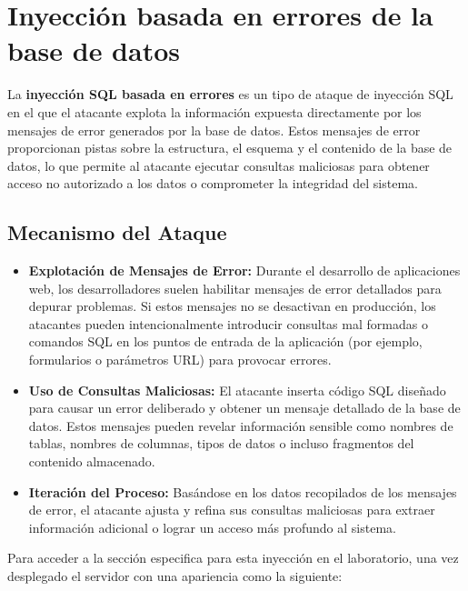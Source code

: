 \documentclass[a4paper,12pt]{article}
\begin{document}
\section{Inyección basada en errores de la base de datos}
La \textbf{inyección SQL basada en errores} es un tipo de ataque de inyección SQL en el que el atacante explota la información 
expuesta directamente por los mensajes de error generados por la base de datos. Estos mensajes de error proporcionan pistas sobre la estructura, 
el esquema y el contenido de la base de datos, lo que permite al atacante ejecutar consultas maliciosas para obtener acceso no autorizado 
a los datos o comprometer la integridad del sistema.

\subsection{Mecanismo del Ataque}

\begin{itemize}
    \item \textbf{Explotación de Mensajes de Error:}
    Durante el desarrollo de aplicaciones web, los desarrolladores suelen habilitar mensajes de error detallados para depurar problemas. 
    Si estos mensajes no se desactivan en producción, los atacantes pueden intencionalmente introducir consultas mal formadas o comandos SQL 
    en los puntos de entrada de la aplicación (por ejemplo, formularios o parámetros URL) para provocar errores.

    \item \textbf{Uso de Consultas Maliciosas:}
    El atacante inserta código SQL diseñado para causar un error deliberado y obtener un mensaje detallado de la base de datos. 
    Estos mensajes pueden revelar información sensible como nombres de tablas, nombres de columnas, tipos de datos o incluso fragmentos del 
    contenido almacenado.

    \item \textbf{Iteración del Proceso:}
    Basándose en los datos recopilados de los mensajes de error, el atacante ajusta y refina sus consultas maliciosas para extraer información 
    adicional o lograr un acceso más profundo al sistema.
\end{itemize}

Para acceder a la sección especifica para esta inyección en el laboratorio, una vez desplegado el servidor con una apariencia como la siguiente:
\end{document}
